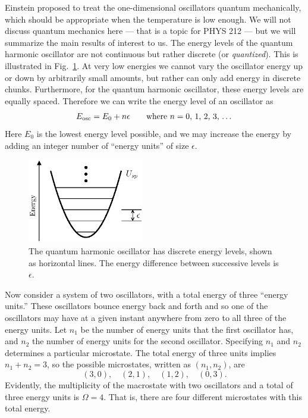 Einstein proposed to treat the one-dimensional oscillators quantum
mechanically, which should be appropriate when the temperature is
low enough.  We will not discuss quantum mechanics here --- that is a
topic for PHYS 212 --- but we will summarize the main results of interest
to us.  The energy levels of the quantum harmonic oscillator are not
continuous but rather discrete (or {\it quantized\/}).  This is
illustrated in Fig.~\ref{fig:qho}.  At very low energies we cannot
vary the oscillator energy up or down by arbitrarily small amounts,
but rather can only add energy in discrete chunks.  Furthermore, for
the quantum harmonic oscillator, these energy levels are equally
spaced.  Therefore we can write the energy level of an oscillator as
\begin{equation}
E_\text{osc} = E_0 + n\epsilon \qquad
\text{where $n=0$, 1, 2, 3, \dots}
\end{equation}
Here $E_0$ is the lowest energy level possible, and we may increase
the energy by adding an integer number of ``energy units'' of size
$\epsilon$. 

\begin{figure}
\begin{center}
\includegraphics[width=2in]{second_law_and_entropy/qho}
\caption{The quantum harmonic oscillator has discrete energy levels,
  shown as horizontal lines.  The energy difference between successive
  levels is $\epsilon$.}
\label{fig:qho}
\end{center}
\end{figure}

Now consider a system of two oscillators, with a total energy of three
``energy units.''  These oscillators bounce energy back and forth and
so one of the oscillators may have at a given instant anywhere from
zero to all three of the energy units.  Let $n_1$ be the number of
energy units that the first oscillator has, and $n_2$ the number of
energy units for the second oscillator.  Specifying $n_1$ and $n_2$
determines a particular microstate.  The total energy of three units
implies $n_1+n_2=3$, so the possible microstates, written as
$(n_1,n_2)$, are
\[
(3,0), \quad (2,1), \quad (1,2), \quad (0,3).
\]
Evidently, the multiplicity of the macrostate with two oscillators and
a total of three energy units is $\Omega =4$.  That is, there are four
different microstates with this total energy.


